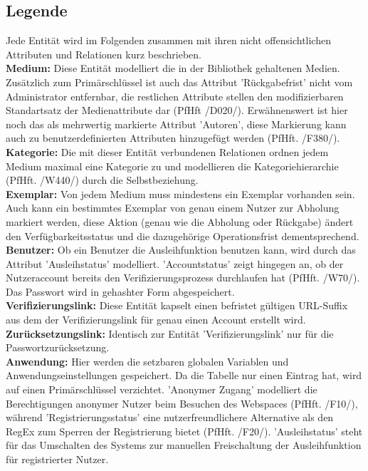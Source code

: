 \documentclass{article}
\begin{document}
\subsection{Legende}
Jede Entität wird im Folgenden zusammen mit ihren nicht offensichtlichen Attributen und Relationen kurz beschrieben.\\
\textbf{Medium:} Diese Entität modelliert die in der Bibliothek gehaltenen Medien. Zusätzlich zum Primärschlüssel ist auch das Attribut 'Rückgabefrist' nicht vom Administrator entfernbar, die restlichen Attribute stellen den modifizierbaren Standartsatz der Medienattribute dar (PfHft /D020/). Erwähnenswert ist hier noch das als mehrwertig markierte Attribut 'Autoren', diese Markierung kann auch zu benutzerdefinierten Attributen hinzugefügt werden (PfHft. /F380/).\\
\textbf{Kategorie:} Die mit dieser Entität verbundenen Relationen ordnen jedem Medium maximal eine Kategorie zu und modellieren die Kategoriehierarchie (PfHft. /W440/) durch die Selbstbeziehung.\\
\textbf{Exemplar:} Von jedem Medium muss mindestens ein Exemplar vorhanden sein. Auch kann ein bestimmtes Exemplar von genau einem Nutzer zur Abholung markiert werden, diese Aktion (genau wie die Abholung oder Rückgabe) ändert den Verfügbarkeitsstatus und die dazugehörige Operationsfrist dementsprechend. \\
\textbf{Benutzer:} Ob ein Benutzer die Ausleihfunktion benutzen kann, wird durch das Attribut 'Ausleihstatus' modelliert. 'Accountstatus' zeigt hingegen an, ob der Nutzeraccount bereits den Verifizierungsprozess durchlaufen hat (PfHft. /W70/). Das Passwort wird in gehashter Form abgespeichert. \\
\textbf{Verifizierungslink:} Diese Entität kapselt einen befristet gültigen URL-Suffix aus dem der Verifizierungslink für genau einen Account erstellt wird.\\
\textbf{Zurücksetzungslink:} Identisch zur Entität 'Verifizierungslink' nur für die Passwortzurücksetzung.\\
\textbf{Anwendung:} Hier werden die setzbaren globalen Variablen und Anwendungseinstellungen gespeichert. Da die Tabelle nur einen Eintrag hat, wird auf einen Primärschlüssel verzichtet. 'Anonymer Zugang' modelliert die Berechtigungen anonymer Nutzer beim Besuchen des Webspaces (PfHft. /F10/), während 'Registrierungsstatus' eine nutzerfreundlichere Alternative als den RegEx zum Sperren der Registrierung bietet (PfHft. /F20/). 'Ausleihstatus' steht für das Umschalten des Systems zur manuellen Freischaltung der Ausleihfunktion für registrierter Nutzer. \\
\end{document}
